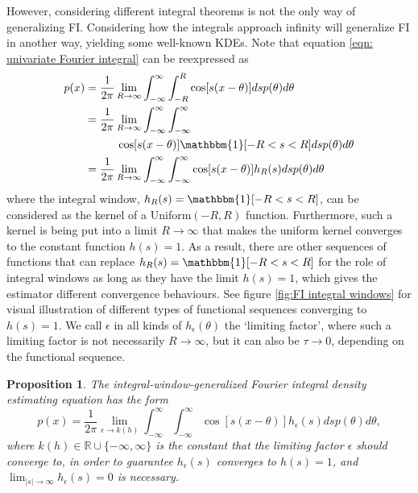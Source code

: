 \documentclass[%
 reprint,
 amsmath,amssymb,
 aps,
]{revtex4-2}
\newtheorem{proposition}[theorem]{Proposition}
\def\R{\mathbb{R}}
\begin{document}
However, considering different integral theorems is not the only way of generalizing FI. Considering how the integrals approach infinity will generalize FI in another way, yielding some well-known KDEs. Note that equation \eqref{eqn: univariate Fourier integral} can be reexpressed as
\begin{align*} 
    p(x) & = \frac{1}{2\pi} \lim_{R \to \infty} \int_{-\infty}^\infty \int_{-R}^R \cos[s(x-\theta)]ds p(\theta)d\theta \\
    & = \frac{1}{2\pi} \lim_{R \to \infty} \int_{-\infty}^\infty \int_{-\infty}^\infty \\
    & \hspace{1cm}\cos[s(x-\theta)] \mathbbm{1}[-R < s < R] ds p(\theta) d\theta \\
    & = \frac{1}{2\pi} \lim_{R \to \infty} \int_{-\infty}^\infty \int_{-\infty}^\infty \cos[s(x-\theta)]h_R(s)ds p(\theta)d\theta
\end{align*}
where the integral window, $h_R(s) = \mathbbm{1}[-R < s < R]$, can be considered as the kernel of a Uniform$(-R, R)$ function. Furthermore, such a kernel is being put into a limit $R \to \infty$ that makes the uniform kernel converges to the constant function $h(s) = 1$. As a result, there are other sequences of functions that can replace $h_R(s) = \mathbbm{1}[-R < s < R]$ for the role of integral windows as long as they have the limit $h(s) = 1$, which gives the estimator different convergence behaviours. See figure \ref{fig:FI integral windows} for visual illustration of different types of functional sequences converging to $h(s) = 1$. We call $\epsilon$ in all kinds of $h_\epsilon(\theta)$ the `limiting factor', where such a limiting factor is not necessarily $R \to \infty$, but it can also be $\tau \to 0$, depending on the functional sequence.
\begin{proposition}
    The integral-window-generalized Fourier integral density estimating equation has the form
    \begin{equation} \label{eqn: integral window h(s)}
        p(x) = \frac{1}{2\pi} \lim_{\epsilon \to k(h)} \int_{-\infty}^\infty \int_{-\infty}^\infty \cos[s(x-\theta)]h_\epsilon(s)ds p(\theta)d\theta,
    \end{equation}
    where $k(h) \in \R \cup \{-\infty, \infty\}$ is the constant that the limiting factor $\epsilon$ should converge to, in order to guarantee $h_\epsilon(s)$ converges to $h(s) = 1$, and $\displaystyle\lim_{|s| \to \infty} h_\epsilon(s) = 0$ is necessary.
\end{proposition}
\end{document}

